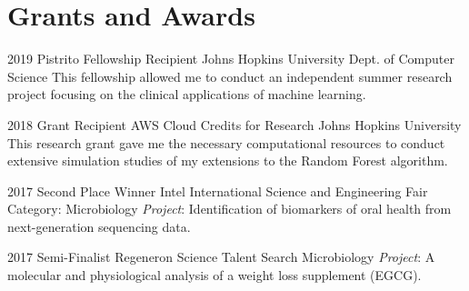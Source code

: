 \section{Grants and Awards}

\cventry
{2019}
{Pistrito Fellowship Recipient}
{Johns Hopkins University}
{Dept. of Computer Science}
{}
{This fellowship allowed me to conduct an independent summer research project focusing on the clinical applications of machine learning.}

\cventry
{2018}
{Grant Recipient}
{AWS Cloud Credits for Research}
{Johns Hopkins University}
{}
{This research grant gave me the necessary computational resources to conduct extensive simulation studies of my extensions to the Random Forest algorithm.}

\cventry
{2017}
{Second Place Winner}
{Intel International Science and Engineering Fair}
{Category: Microbiology}
{}
{\textit{Project}: Identification of biomarkers of oral health from next-generation sequencing data.}

\cventry
{2017}
{Semi-Finalist}
{Regeneron Science Talent Search}
{Microbiology}
{}
{\textit{Project}: A molecular and physiological analysis of a weight loss supplement (EGCG).}